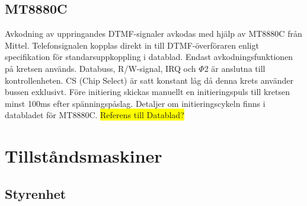 \documentclass[a4paper,11pt]{article}
\begin{document}
	\subsection{MT8880C}
	\label{MT8880C}
		Avkodning av uppringandes DTMF-signaler avkodas med hjälp av MT8880C från Mittel. 
		Telefonsignalen kopplas direkt in till DTMF-överföraren enligt specifikation för standarsuppkoppling i datablad. Endast avkodningsfunktionen på 		kretsen används. Databuss, R/W-signal, IRQ och $\Phi$2 är anslutna till kontrollenheten. 
		CS (Chip Select) är satt konstant låg då denna krets använder bussen exklusivt. 
Före initiering skickas manuellt en initieringspuls till kretsen minst 100ms efter spänningspåslag. Detaljer om initieringscykeln finns i databladet för MT8880C.
\colorbox{yellow}{Referens till Datablad?} \\

\section{Tillståndsmaskiner}
\label{sec:Tillstandsmaskiner}		
\subsection{Styrenhet}
\end{document}
